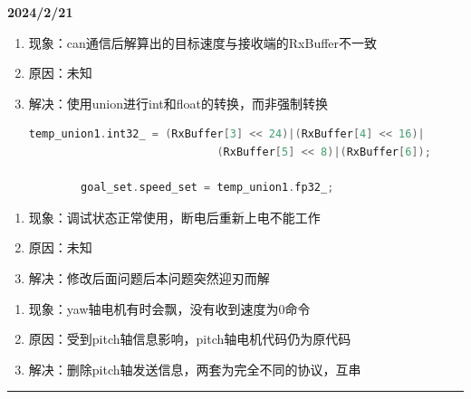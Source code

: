 \documentclass[main.tex]{subfiles}
\begin{document}
\textbf{2024/2/21}
\begin{enumerate}
    \item 现象：can通信后解算出的目标速度与接收端的RxBuffer不一致
    \item 原因：未知
    \item 解决：使用union进行int和float的转换，而非强制转换
    \begin{lstlisting}[language=C]
        temp_union1.int32_ = (RxBuffer[3] << 24)|(RxBuffer[4] << 16)|
                             (RxBuffer[5] << 8)|(RxBuffer[6]);
                             
        goal_set.speed_set = temp_union1.fp32_;
    \end{lstlisting}
\end{enumerate}

\begin{enumerate}
    \item 现象：调试状态正常使用，断电后重新上电不能工作
    \item 原因：未知
    \item 解决：修改后面问题后本问题突然迎刃而解\\
\end{enumerate}

\begin{enumerate}
    \item 现象：yaw轴电机有时会飘，没有收到速度为0命令
    \item 原因：受到pitch轴信息影响，pitch轴电机代码仍为原代码
    \item 解决：删除pitch轴发送信息，两套为完全不同的协议，互串
\end{enumerate}
\rule{\linewidth}{0.3pt}
\end{document}
